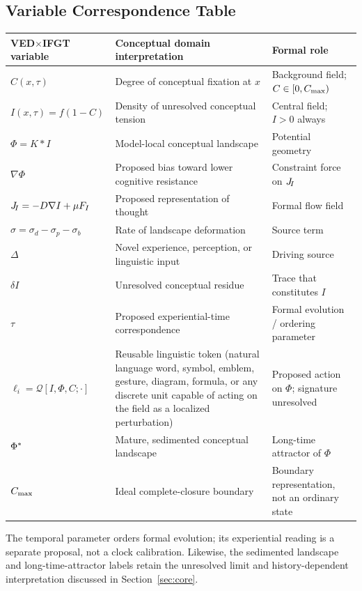 \subsection{Variable Correspondence Table}

\begin{center}
\renewcommand{\arraystretch}{1.5}
\begin{tabular}{p{}p{}p{}}
\toprule
\textbf{VED$\times$IFGT variable} &
\textbf{Conceptual domain interpretation} &
\textbf{Formal role} \\
\midrule
$C(x,\tau)$ &
Degree of conceptual fixation at $x$ &
Background field; $C \in [0,C_{\max})$ \\
$I(x,\tau) = f(1-C)$ &
Density of unresolved conceptual tension &
Central field; $I > 0$ always \\
$\Phi = K*I$ &
Model-local conceptual landscape &
Potential geometry \\
$\nabla\Phi$ &
Proposed bias toward lower cognitive resistance &
Constraint force on $J_{\!I}$ \\
$J_{\!I} = -D\nabla I + \mu F_I$ &
Proposed representation of thought &
Formal flow field \\
$\sigma = \sigma_d - \sigma_p - \sigma_b$ &
Rate of landscape deformation &
Source term \\
$\Delta$ &
Novel experience, perception, or linguistic input &
Driving source \\
$\delta I$ &
Unresolved conceptual residue &
Trace that constitutes $I$ \\
$\tau$ &
Proposed experiential-time correspondence &
Formal evolution / ordering parameter \\
$\ell_i = \mathcal{Q}[I,\Phi,C;\cdot]$ &
Reusable linguistic token (natural language word, symbol, emblem,
gesture, diagram, formula, or any discrete unit capable of acting on the
field as a localized perturbation) &
Proposed action on $\Phi$; signature unresolved \\
$\Phi^{*}$ &
Mature, sedimented conceptual landscape &
Long-time attractor of $\Phi$ \\
$C_{\max}$ &
Ideal complete-closure boundary &
Boundary representation, not an ordinary state \\
\bottomrule
\end{tabular}
\end{center}

The temporal parameter orders formal evolution; its experiential reading
is a separate proposal, not a clock calibration. Likewise, the sedimented
landscape and long-time-attractor labels retain the unresolved limit and
history-dependent interpretation discussed in Section~\ref{sec:core}.


